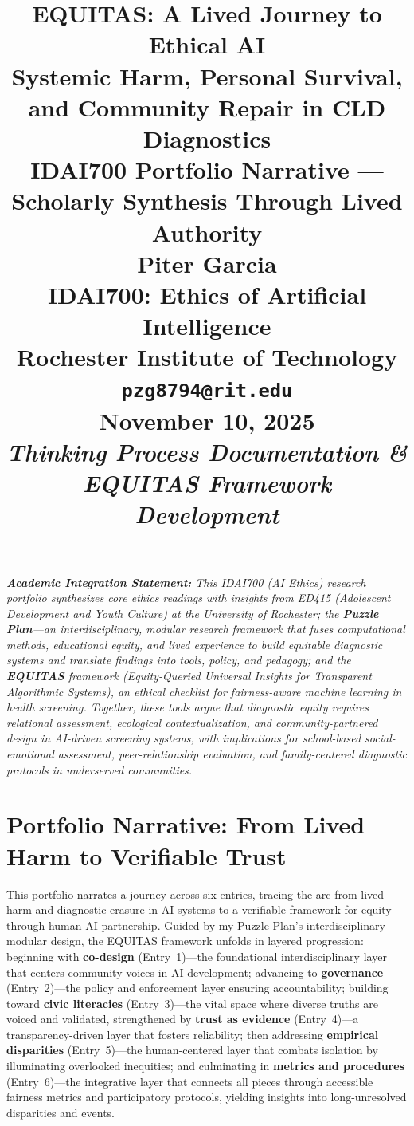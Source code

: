 \documentclass[12pt,twoside]{article}
\title{
\vspace*{1.5in}
\textbf{\Huge EQUITAS: A Lived Journey to Ethical AI}\\[0.5em]
\Large Systemic Harm, Personal Survival, and Community Repair in CLD Diagnostics\\[1.5em]
\large IDAI700 Portfolio Narrative --- Scholarly Synthesis Through Lived Authority\\[2em]

\vfill
\Large \textbf{Piter Garcia}\\
\normalsize IDAI700: Ethics of Artificial Intelligence\\
Rochester Institute of Technology\\
\texttt{pzg8794@rit.edu}\\[1em]

\large \textbf{November 10, 2025}\\
\normalsize \textit{Thinking Process Documentation \& EQUITAS Framework Development}
}
\author{}
\date{}
\begin{document}
\thispagestyle{empty}
\maketitle

\vspace{0.5in}
\noindent\textit{\tiny\textbf{Academic Integration Statement:} 
This IDAI700 (AI Ethics) research portfolio synthesizes core ethics readings with insights from ED415 (Adolescent Development and Youth Culture) at the University of Rochester; the \textbf{Puzzle Plan}---an interdisciplinary, modular research framework that fuses computational methods, educational equity, and lived experience to build equitable diagnostic systems and translate findings into tools, policy, and pedagogy; and the \textbf{EQUITAS} framework (Equity-Queried Universal Insights for Transparent Algorithmic Systems), an ethical checklist for fairness-aware machine learning in health screening. Together, these tools argue that \emph{diagnostic equity requires relational assessment, ecological contextualization, and community-partnered design} in AI-driven screening systems, with implications for school-based social-emotional assessment, peer-relationship evaluation, and family-centered diagnostic protocols in underserved communities.}
\newpage
\pagestyle{fancy}

\section*{Portfolio Narrative: From Lived Harm to Verifiable Trust}

\noindent This portfolio narrates a journey across six entries, tracing the arc from lived harm and diagnostic erasure in AI systems to a verifiable framework for equity through human-AI partnership. Guided by my Puzzle Plan's interdisciplinary modular design, the EQUITAS framework unfolds in layered progression: beginning with \textbf{co-design} (Entry~1)---the foundational interdisciplinary layer that centers community voices in AI development; advancing to \textbf{governance} (Entry~2)---the policy and enforcement layer ensuring accountability; building toward \textbf{civic literacies} (Entry~3)---the vital space where diverse truths are voiced and validated, strengthened by \textbf{trust as evidence} (Entry~4)---a transparency-driven layer that fosters reliability; then addressing \textbf{empirical disparities} (Entry~5)---the human-centered layer that combats isolation by illuminating overlooked inequities; and culminating in \textbf{metrics and procedures} (Entry~6)---the integrative layer that connects all pieces through accessible fairness metrics and participatory protocols, yielding insights into long-unresolved disparities and events.
\end{document}
